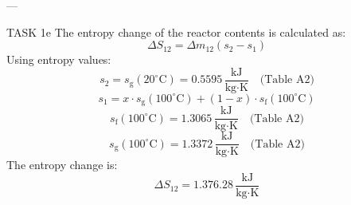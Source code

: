 ---

TASK 1e  
The entropy change of the reactor contents is calculated as:  
\[
\Delta S_{12} = \Delta m_{12} \left( s_{2} - s_{1} \right)
\]  
Using entropy values:  
\[
s_{2} = s_{\text{g}}(20^\circ\text{C}) = 0.5595 \, \frac{\text{kJ}}{\text{kg·K}} \quad \text{(Table A2)}
\]  
\[
s_{1} = x \cdot s_{\text{g}}(100^\circ\text{C}) + (1-x) \cdot s_{\text{f}}(100^\circ\text{C})
\]  
\[
s_{\text{f}}(100^\circ\text{C}) = 1.3065 \, \frac{\text{kJ}}{\text{kg·K}} \quad \text{(Table A2)}
\]  
\[
s_{\text{g}}(100^\circ\text{C}) = 1.3372 \, \frac{\text{kJ}}{\text{kg·K}} \quad \text{(Table A2)}
\]  
The entropy change is:  
\[
\Delta S_{12} = 1.376.28 \, \frac{\text{kJ}}{\text{kg·K}}
\]  